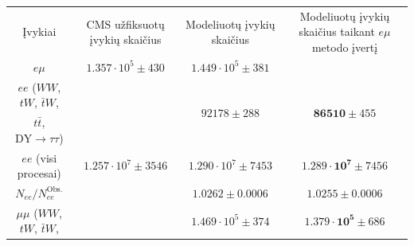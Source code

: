 \documentclass[a4paper, 12pt]{article}
\newcommand{\WW}{W\! W}
\newcommand{\mumu}{\mu\mu}
\newcommand{\DYtau}{\mathrm{DY} \! \rightarrow \! \tau\tau}
\begin{document}
\begin{centering}
\begin{table}
\begin{tabular}{|c|c|c|c|} %
	\hline
	
	\multirow{3}{8em}{\centering Įvykiai} &
	\multirow{3}{7em}{\centering CMS užfiksuotų įvykių skaičius} &
	\multirow{3}{9em}{\centering Modeliuotų įvykių skaičius} &
	\multirow{3}{10em}{\centering Modeliuotų įvykių skaičius taikant $e\mu$ metodo įvertį} \\
	
 	& & & \\
 	& & & \\
	\hline \hline
	
	\multirow{2}{8em}{\centering $e\mu$} &
	\multirow{2}{7em}{\centering $1.357 \cdot 10^5 \pm 430$} &
	\multirow{2}{9em}{\centering $1.449 \cdot 10^5 \pm 381$ } &
	\multirow{2}{5em}{\centering \textendash }\\
	
 	& & & \\
	\hline
	
	$ee$ ($\WW$, $tW$, $\bar{t}W$, &
	\multirow{2}{7em}{\centering\textendash} &
	\multirow{2}{9em}{\centering $92178 \pm 288$} &
	\multirow{2}{9em}{\centering$\mathbf{86510} \pm 455$} \\
	
	$t\bar{t}$, $\DYtau$) & & & \\
	\hline
	
	\multirow{2}{8em}{\centering $ee$ (visi procesai)} &
	\multirow{2}{7em}{\centering $1.257 \cdot 10^7 \pm 3546$} &
	\multirow{2}{10em}{\centering $1.290 \cdot 10^7 \pm 7453$}
	&\multirow{2}{10em}{\centering $\mathbf{1.289 \cdot 10^7} \pm 7456$} \\
	
 	& & & \\
	\hline

	\multirow{2}{8em}{\centering $N_{ee}/N_{ee}^{\mathrm{Obs.}}$} &
	\multirow{2}{7em}{\centering 1} &
	\multirow{2}{10em}{\centering $1.0262 \pm 0.0006$} &
	\multirow{2}{10em}{\centering $1.0255 \pm 0.0006$} \\
	
 	& & & \\
	\hline

	$\mumu$ ($\WW$, $tW$, $\bar{t}W$, &
	\multirow{2}{7em}{\centering\textendash} &
	\multirow{2}{9em}{\centering $1.469 \cdot 10^5 \pm 374$} &
	\multirow{2}{9em}{\centering$\mathbf{1.379 \cdot 10^5} \pm 686$} \\
	

\end{tabular}
\end{table}
\end{centering}
\end{document}
